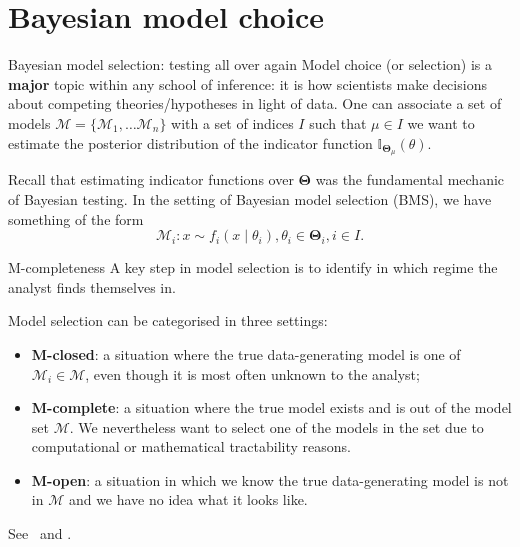 \section*{Bayesian model choice}
\begin{frame}{Bayesian model selection: testing all over again}
 Model choice (or selection) is a \textbf{major} topic within any school of inference: it is how scientists make decisions about competing theories/hypotheses in light of data.
 One can associate a set of models $\boldsymbol{\mathcal{M}} = \{ \mathcal{M}_1, \ldots \mathcal{M}_n \}$ with a set of indices $I$ such that $\mu \in I$ we want to estimate the posterior distribution of the indicator function $\mathbb{I}_{\boldsymbol{\Theta}_\mu}(\theta)$.
 
 Recall that estimating indicator functions over $\boldsymbol{\Theta}$ was the fundamental mechanic of Bayesian testing.
 In the setting of Bayesian model selection (BMS), we have something of the form
 \begin{equation*}
  \mathcal{M}_i : x \sim f_i(x \mid \theta_i), \theta_i \in \boldsymbol{\Theta}_i, i \in I.
 \end{equation*}
\end{frame}
\begin{frame}{M-completeness}
A key step in model selection is to identify in which regime the analyst finds themselves in.
\begin{defn}
 \label{def:m-open}
 Model selection can be categorised in three settings:
 \begin{itemize}
  \item \textbf{M-closed}: a situation where the true data-generating model is one of $\mathcal{M}_i \in \boldsymbol{\mathcal{M}}$, even though  it is most often  unknown to the  analyst;
  \item \textbf{M-complete}: a situation where the true model exists and is out of the model set $\boldsymbol{\mathcal{M}}$.
  We nevertheless want to select one of the models in the set due to computational or mathematical tractability reasons.
  \item \textbf{M-open}: a situation in which we know the true data-generating model is not in $\boldsymbol{\mathcal{M}}$ and we have no idea what it looks like.
 \end{itemize}
\end{defn}
See~\cite{Bernardo2000} and \cite{Yao2018}.
\end{frame}
